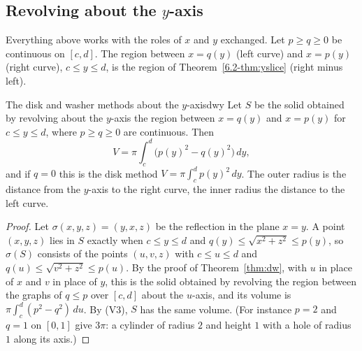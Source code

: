 \documentclass[11pt]{article}
\begin{document}
\subsection*{Revolving about the $y$-axis}

Everything above works with the roles of $x$ and $y$ exchanged. Let $p\ge q\ge0$ be continuous on $[c,d]$. The region between $x=q(y)$ (left curve) and $x=p(y)$ (right curve), $c\le y\le d$, is the region of Theorem~\ref{6.2-thm:yslice} (right minus left).

\begin{thm}{The disk and washer methods about the $y$-axis}{dwy}
Let $S$ be the solid obtained by revolving about the $y$-axis the region between $x=q(y)$ and $x=p(y)$ for $c\le y\le d$, where $p\ge q\ge0$ are continuous. Then
\[
V=\pi\int_c^d\bigl(p(y)^2-q(y)^2\bigr)\,dy ,
\]
and if $q=0$ this is the disk method $V=\pi\int_c^dp(y)^2\,dy$. The outer radius is the distance from the $y$-axis to the right curve, the inner radius the distance to the left curve.
\end{thm}
\begin{proof}
Let $\sigma(x,y,z)=(y,x,z)$ be the reflection in the plane $x=y$. A point $(x,y,z)$ lies in $S$ exactly when $c\le y\le d$ and $q(y)\le\sqrt{x^2+z^2}\le p(y)$, so $\sigma(S)$ consists of the points $(u,v,z)$ with $c\le u\le d$ and $q(u)\le\sqrt{v^2+z^2}\le p(u)$. By the proof of Theorem~\ref{thm:dw}, with $u$ in place of $x$ and $v$ in place of $y$, this is the solid obtained by revolving the region between the graphs of $q\le p$ over $[c,d]$ about the $u$-axis, and its volume is $\pi\int_c^d(p^2-q^2)\,du$. By (V3), $S$ has the same volume. (For instance $p=2$ and $q=1$ on $[0,1]$ give $3\pi$: a cylinder of radius $2$ and height $1$ with a hole of radius $1$ along its axis.)
\end{proof}
\end{document}
